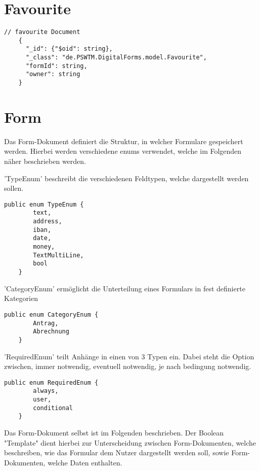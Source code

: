 \section{Favourite}
\begin{lstlisting}[label={lst:favourite}]
    // favourite Document
    {
      "_id": {"$oid": string},
      "_class": "de.PSWTM.DigitalForms.model.Favourite",
      "formId": string,
      "owner": string
    }

\end{lstlisting}


\section{Form}\label{sec:form}
Das Form-Dokument definiert die Struktur, in welcher Formulare gespeichert werden.
Hierbei werden verschiedene \gls{enum}s verwendet, welche im Folgenden näher beschrieben werden.


'TypeEnum' beschreibt die verschiedenen Feldtypen, welche dargestellt werden sollen.
\begin{lstlisting}[label={lst:TypeEnum}]
    public enum TypeEnum {
        text,
        address,
        iban,
        date,
        money,
        TextMultiLine,
        bool
    }
\end{lstlisting}


'CategoryEnum' ermöglicht die Unterteilung eines Formulars in fest definierte Kategorien
\begin{lstlisting}[label={lst:CategoryEnum}]
    public enum CategoryEnum {
        Antrag,
        Abrechnung
    }
\end{lstlisting}


'RequiredEnum' teilt Anhänge in einen von 3 Typen ein.
Dabei steht die Option zwischen, immer notwendig, eventuell notwendig, je nach bedingung notwendig.
\begin{lstlisting}[label={lst:RequiredEnum}]
    public enum RequiredEnum {
        always,
        user,
        conditional
    }
\end{lstlisting}


Das Form-Dokument selbst ist im Folgenden beschrieben.
Der Boolean "Template" dient hierbei zur Unterscheidung zwischen
Form-Dokumenten, welche beschreiben, wie das Formular dem Nutzer
dargestellt werden soll, sowie Form-Dokumenten, welche Daten enthalten.


